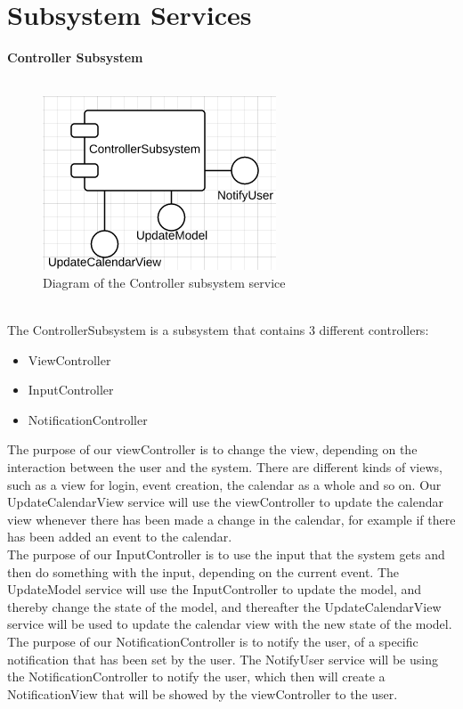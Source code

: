 \chapter{Subsystem Services}
\textbf{Controller Subsystem}\\\\
\begin{figure}[h!]
	\centering
		\includegraphics[scale=0.8]{ControllerServices}
	\caption{Diagram of the Controller subsystem service}
  \label{fig:ControllerService}
\end{figure}\\
The ControllerSubsystem is a subsystem that contains 3 different controllers:

\begin{itemize}
  \item ViewController
  \item InputController
  \item NotificationController
\end{itemize}

The purpose of our viewController is to change the view, depending on the interaction between the user and the system. There are different kinds of views, such as a view for login, event creation, the calendar as a whole and so on. Our UpdateCalendarView service will use the viewController to update the calendar view whenever there has been made a change in the calendar, for example if there has been added an event to the calendar.\\

The purpose of our InputController is to use the input that the system gets and then do something with the input, depending on the current event. The UpdateModel service will use the InputController to update the model, and thereby change the state of the model, and thereafter the UpdateCalendarView service will be used to update the calendar view with the new state of the model.\\

The purpose of our NotificationController is to notify the user, of a specific notification that has been set by the user. The NotifyUser service will be using the NotificationController to notify the user, which then will create a NotificationView that will be showed by the viewController to the user.\\

